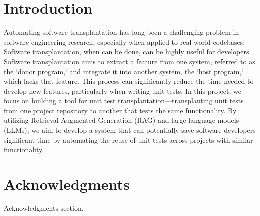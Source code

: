 \documentclass[sigconf]{acmart}
\begin{document}



\maketitle

\section{Introduction}
Automating software transplantation has long been a challenging problem in software engineering research, especially when applied to real-world codebases. Software transplantation, when can be done, can be highly useful for developers. Software transplantation aims to extract a feature from one system, referred to as the `donor program,` and integrate it into another system, the `host program,` which lacks that feature. This process can significantly reduce the time needed to develop new features, particularly when writing unit tests. In this project, we focus on building a tool for unit test transplantation—transplanting unit tests from one project repository to another that tests the same functionality. By utilizing Retrieval-Augmented Generation (RAG) and large language models (LLMs), we aim to develop a system that can potentially save software developers significant time by automating the reuse of unit tests across projects with similar functionality.

\section{Acknowledgments}
Acknowledgments section.
\end{document}

